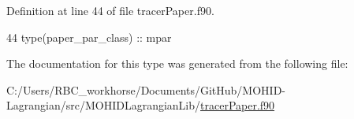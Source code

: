 Definition at line 44 of file tracer\+Paper.\+f90.


\begin{DoxyCode}
44         \textcolor{keywordtype}{type}(paper\_par\_class)   :: mpar
\end{DoxyCode}


The documentation for this type was generated from the following file\+:\begin{DoxyCompactItemize}
\item 
C\+:/\+Users/\+R\+B\+C\+\_\+workhorse/\+Documents/\+Git\+Hub/\+M\+O\+H\+I\+D-\/\+Lagrangian/src/\+M\+O\+H\+I\+D\+Lagrangian\+Lib/\mbox{\hyperlink{tracer_paper_8f90}{tracer\+Paper.\+f90}}\end{DoxyCompactItemize}
